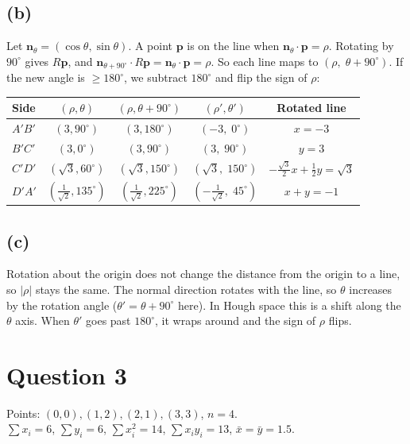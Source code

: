 \documentclass[11pt]{article}
\begin{document}
\subsection*{(b)}
Let $\mathbf n_\theta=(\cos\theta,\sin\theta)$. A point $\mathbf p$ is on the line when $\mathbf n_\theta\cdot\mathbf p=\rho$. Rotating by $90^\circ$ gives $R\mathbf p$, and $\mathbf n_{\theta+90^\circ}\cdot R\mathbf p=\mathbf n_\theta\cdot\mathbf p=\rho$. So each line maps to $(\rho,\;\theta+90^\circ)$. If the new angle is $\ge180^\circ$, we subtract $180^\circ$ and flip the sign of $\rho$:
\begin{center}
\begin{tabular}{lcccc}\toprule
Side & $(\rho,\theta)$ & $(\rho,\theta+90^\circ)$ & $(\rho',\theta')$ & Rotated line\\\midrule
$A'B'$ & $(3,90^\circ)$ & $(3,180^\circ)$ & $(-3,\;0^\circ)$ & $x=-3$\\
$B'C'$ & $(3,0^\circ)$ & $(3,90^\circ)$ & $(3,\;90^\circ)$ & $y=3$\\
$C'D'$ & $(\sqrt3,60^\circ)$ & $(\sqrt3,150^\circ)$ & $(\sqrt3,\;150^\circ)$ & $-\tfrac{\sqrt3}{2}x+\tfrac12y=\sqrt3$\\
$D'A'$ & $(\tfrac1{\sqrt2},135^\circ)$ & $(\tfrac1{\sqrt2},225^\circ)$ & $(-\tfrac1{\sqrt2},\;45^\circ)$ & $x+y=-1$\\\bottomrule
\end{tabular}
\end{center}

\subsection*{(c)}
Rotation about the origin does not change the distance from the origin to a line, so $|\rho|$ stays the same. The normal direction rotates with the line, so $\theta$ increases by the rotation angle ($\theta'=\theta+90^\circ$ here). In Hough space this is a shift along the $\theta$ axis. When $\theta'$ goes past $180^\circ$, it wraps around and the sign of $\rho$ flips.

\section*{Question 3}
Points: $(0,0),(1,2),(2,1),(3,3)$, $n=4$.\\
$\sum x_i=6$, $\sum y_i=6$, $\sum x_i^2=14$, $\sum x_iy_i=13$, \quad $\bar x=\bar y=1.5$.
\end{document}
